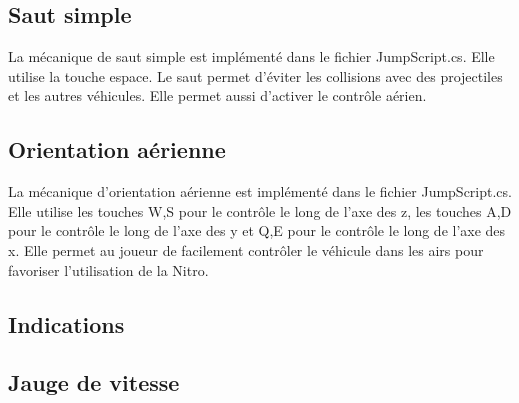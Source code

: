 \documentclass[a4paper, 12pt]{article} %
\begin{document}
\subsection{Saut simple}
La mécanique de saut simple est implémenté dans le fichier JumpScript.cs. Elle utilise la touche espace. Le saut permet d'éviter les collisions avec des projectiles et les autres véhicules. Elle permet aussi d'activer le contrôle aérien.
\subsection{Orientation aérienne}
La mécanique d'orientation aérienne est implémenté dans le fichier JumpScript.cs. Elle utilise les touches W,S pour le contrôle le long de l'axe des z, les touches A,D pour le contrôle le long de l'axe des y et Q,E pour le contrôle le long de l'axe des x. Elle permet au joueur de facilement contrôler le véhicule dans les airs pour favoriser l'utilisation de la Nitro.
\subsection{Indications}
\subsection{Jauge de vitesse}

\vspace{10pt}
\end{document}
